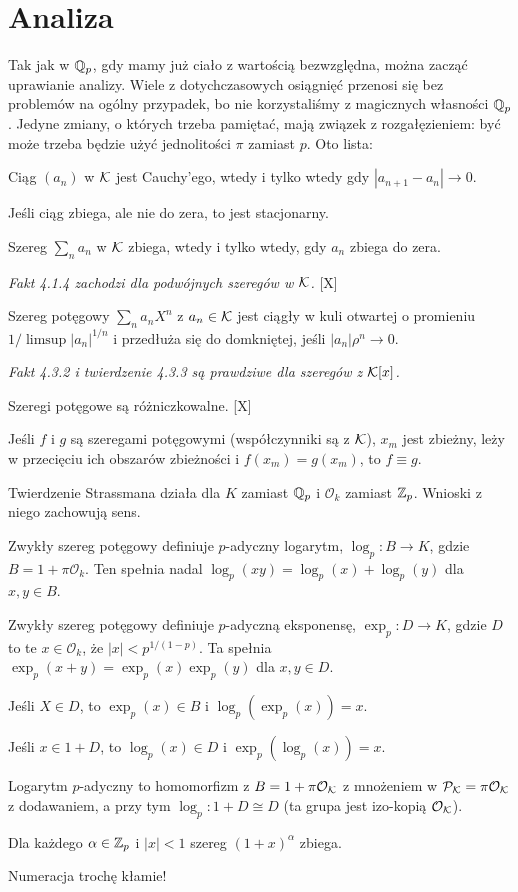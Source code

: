 \section{Analiza}
Tak jak w $\mathbb Q_p$, gdy mamy już ciało z wartością bezwzględna, można zacząć uprawianie analizy.
Wiele z dotychczasowych osiągnięć przenosi się bez problemów na ogólny przypadek, bo nie korzystaliśmy z magicznych własności $\mathbb Q_p$.
Jedyne zmiany, o których trzeba pamiętać, mają związek z rozgałęzieniem: być może trzeba będzie użyć jednolitości $\pi$ zamiast $p$. Oto lista:
\begin{enumx}
	\item Ciąg $(a_n)$ w $\mathcal K$ jest Cauchy'ego, wtedy i tylko wtedy gdy $|a_{n+1} - a_n| \to 0$.
	\item Jeśli ciąg zbiega, ale nie do zera, to jest stacjonarny.
	\item Szereg $\sum_n a_n$ w $\mathcal K$ zbiega, wtedy i tylko wtedy, gdy $a_n$ zbiega do zera.
	\item \emph{\color{black}Fakt 4.1.4 zachodzi dla podwójnych szeregów w $\mathcal K$.} [X]
	\item Szereg potęgowy $\sum_n  a_n X^n$ z $a_n \in \mathcal K$ jest ciągły w kuli otwartej o promieniu $1/\limsup |a_n|^{1/n}$ i przedłuża się do domkniętej, jeśli $|a_n| \rho^n \to 0$.
	\item \emph{\color{black} Fakt 4.3.2 i twierdzenie 4.3.3 są prawdziwe dla szeregów z $\mathcal K[x]$.}
	\item Szeregi potęgowe są różniczkowalne. [X]
	\item Jeśli $f$ i $g$ są szeregami potęgowymi (współczynniki są z $\mathcal K$), $x_m$ jest zbieżny, leży w przecięciu ich obszarów zbieżności i $f(x_m) = g(x_m)$, to $f \equiv g$.
	\item Twierdzenie Strassmana działa dla $K$ zamiast $\mathbb Q_p$ i $\mathcal O_k$ zamiast $\mathbb Z_p$.
	Wnioski z niego zachowują sens.
	\item Zwykły szereg potęgowy definiuje $p$-adyczny logarytm, $\log_p \colon B \to K$, gdzie $B = 1 + \pi \mathcal O_k$.
	Ten spełnia nadal $\log_p(xy) = \log_p(x) + \log_p(y)$ dla $x, y \in B$.
	\item Zwykły szereg potęgowy definiuje $p$-adyczną eksponensę, $\exp_p \colon D \to K$, gdzie $D$ to te $x \in \mathcal O_k$, że $|x| < p^{1/(1-p)}$.
	Ta spełnia $\exp_p(x+y) = \exp_p(x) \exp_p(y)$ dla $x, y \in D$.
	\item Jeśli $X \in D$, to $\exp_p(x) \in B$ i $\log_p(\exp_p(x)) = x$.
	\item Jeśli $x \in 1+D$, to $\log_p(x) \in D$ i $\exp_p(\log_p(x)) = x$.
	\item Logarytm $p$-adyczny to homomorfizm z $B=1+\pi \mathcal O_\mathcal K$ z mnożeniem w $\mathcal P_\mathcal K = \pi \mathcal O_\mathcal K$ z dodawaniem, a przy tym $\log_p \colon 1 + D \cong D$ (ta grupa jest izo-kopią $\mathcal O_{\mathcal K}$).
	\item Dla każdego $\alpha \in \mathbb Z_p$ i $|x| < 1$ szereg $(1+x)^\alpha$ zbiega.
	\item Numeracja trochę kłamie!
\end{enumx}
